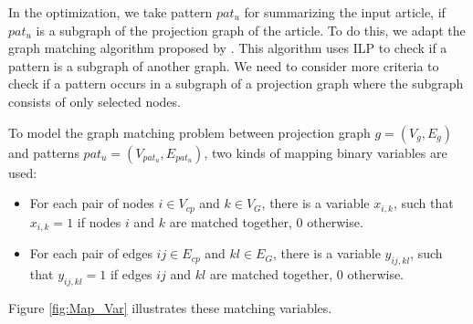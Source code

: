In the optimization, we take pattern $pat_{u}$ for summarizing the input article, if $pat_{u}$ is a subgraph of the projection graph of the article. 
To do this, we adapt the graph matching algorithm proposed by .
This algorithm uses ILP to check if a pattern is a subgraph of another graph. 
We need to consider more criteria to check if a pattern occurs in a subgraph of a projection graph where the subgraph consists of only selected nodes. 

To model the graph matching problem between projection graph $g=(V_{g},E_{g})$ and patterns $pat_{u}=(V_{pat_{u}},E_{pat_{u}})$, two kinds of mapping binary variables are used: 
\begin{itemize}


\item For each pair of nodes $i \in V_{cp}$ and $k \in V_G$, there is a variable $x_{i,k}$, such that $x_{i,k} = 1$ if nodes $i$ and $k$ are matched together, $0$ otherwise. 

\item For each pair of edges $ij \in E_{cp}$ and $kl \in E_G$, there is a variable $y_{ij,kl}$, such that $y_{ij,kl} = 1$ if edges $ij$ and $kl$ are matched together, $0$ otherwise.

\end{itemize}

Figure \ref{fig:Map_Var} illustrates these matching variables. 

